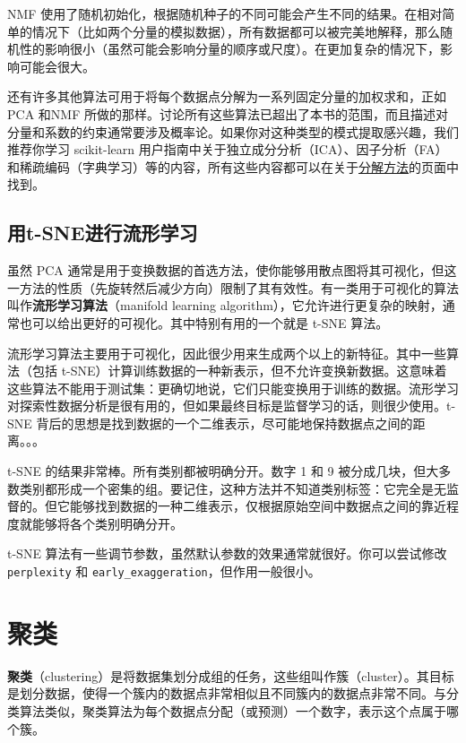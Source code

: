 NMF 使用了随机初始化，根据随机种子的不同可能会产生不同的结果。在相对简单的情况下（比如两个分量的模拟数据），所有数据都可以被完美地解释，那么随机性的影响很小（虽然可能会影响分量的顺序或尺度）。在更加复杂的情况下，影响可能会很大。

还有许多其他算法可用于将每个数据点分解为一系列固定分量的加权求和，正如 PCA 和NMF 所做的那样。讨论所有这些算法已超出了本书的范围，而且描述对分量和系数的约束通常要涉及概率论。如果你对这种类型的模式提取感兴趣，我们推荐你学习 scikit-learn 用户指南中关于独立成分分析（ICA）、因子分析（FA）和稀疏编码（字典学习）等的内容，所有这些内容都可以在关于\href{https://scikit-learn.org/stable/modules/decomposition.html}{分解方法}的页面中找到。
\subsection{用t-SNE进行流形学习}
虽然 PCA 通常是用于变换数据的首选方法，使你能够用散点图将其可视化，但这一方法的性质（先旋转然后减少方向）限制了其有效性。有一类用于可视化的算法叫作\textbf{流形学习算法}（manifold learning algorithm），它允许进行更复杂的映射，通常也可以给出更好的可视化。其中特别有用的一个就是 t-SNE 算法。

流形学习算法主要用于可视化，因此很少用来生成两个以上的新特征。其中一些算法（包括 t-SNE）计算训练数据的一种新表示，但不允许变换新数据。这意味着这些算法不能用于测试集：更确切地说，它们只能变换用于训练的数据。流形学习对探索性数据分析是很有用的，但如果最终目标是监督学习的话，则很少使用。t-SNE 背后的思想是找到数据的一个二维表示，尽可能地保持数据点之间的距离。。。


t-SNE 的结果非常棒。所有类别都被明确分开。数字 1 和 9 被分成几块，但大多数类别都形成一个密集的组。要记住，这种方法并不知道类别标签：它完全是无监督的。但它能够找到数据的一种二维表示，仅根据原始空间中数据点之间的靠近程度就能够将各个类别明确分开。

t-SNE 算法有一些调节参数，虽然默认参数的效果通常就很好。你可以尝试修改 \verb|perplexity| 和 \verb|early_exaggeration|，但作用一般很小。
\section{聚类}
\textbf{聚类}（clustering）是将数据集划分成组的任务，这些组叫作簇（cluster）。其目标是划分数据，使得一个簇内的数据点非常相似且不同簇内的数据点非常不同。与分类算法类似，聚类算法为每个数据点分配（或预测）一个数字，表示这个点属于哪个簇。
